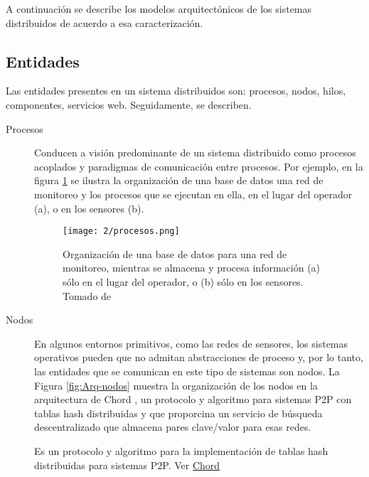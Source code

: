 A  continuación se describe los modelos arquitect\'onicos de los sistemas distribuidos de acuerdo a esa caracterización.

\subsection {Entidades}
\label{subsec:entidades}
Las entidades presentes en un sistema distribuidos son: procesos, nodos, hilos, componentes, servicios web. Seguidamente, se describen.

\begin{description}	
	\item [Procesos] Conducen a visión  predominante de un sistema distribuido como \gls{procesos} acoplados y paradigmas de comunicación entre procesos.  
	Por ejemplo\cite{Tanenbaum2007},  en la figura \ref{fig:Arq-procesos} se ilustra la organización de una base de datos una red de monitoreo y los procesos que se ejecutan en ella, en el lugar del operador (a), o en los sensores (b). 
	
	\begin{figure}%
			\begin{center}
		\texttt{[image: 2/procesos.png]}
		\caption{Organización de una base de datos para una red de monitoreo, 	mientras se almacena y procesa información (a) sólo en el lugar del operador, 	o (b) sólo en los sensores. Tomado de \cite{Tanenbaum2007}}
		\label{fig:Arq-procesos}
			\end{center}
	  \end{figure} 
	
	\item [Nodos]  En algunos entornos primitivos, como las redes de sensores,  los sistemas operativos pueden que no admitan abstracciones de proceso  y, por lo tanto, las entidades que se comunican en este tipo de sistemas son \gls{nodos}. 
	La Figura \ref{fig:Arq-nodos} muestra la organización de los nodos en la arquitectura de Chord \cite{Stoica2001}, un protocolo y algoritmo para sistemas P2P con \gls{tablas hash distribuidas}   y que proporcina un servicio de búsqueda descentralizado que almacena pares clave/valor para esas redes. 
	
 		
 		\begin{tcolorbox}
 			[colback=red!5!white,colframe=red!75!black,fonttitle=\bfseries,title=Chord]
 				Es un protocolo y algoritmo para la implementaci\'on de tablas hash distribuidas para sistemas P2P. Ver \href{https://github.com/sit/dht/wiki}{Chord} 
 		 

\end{tcolorbox}
\end{description}

